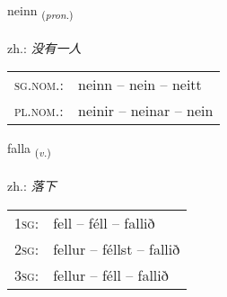 \documentclass[frontgrid, backgrid]{flacards}\usepackage[]{graphicx}\usepackage[]{xcolor}
\begin{document}
\renewcommand{\flhead}{\vskip5pt \fboxsep=0pt {\small\bfseries\footnotesize Fornafn | 代词}}
\renewcommand{\fcfoot}{\vskip5pt \fboxsep=0pt \hspace{2pt}{\small\bfseries\footnotesize 1K}}

\renewcommand{\blhead}{\vskip5pt {\small\bfseries\footnotesize Fornafn | 代词 }}
\renewcommand{\bcfoot}{\vskip5pt \hspace{2pt}{\small\bfseries\footnotesize 1K}}


{neinn \small{\textsubscript{(\textit{pron.})}} \\[1ex] %
\textphonetic{[neitn̥]} \\
zh.: \emph{没有一人} \\  [2ex]
\renewcommand*{\arraystretch}{0.8}
\begin{tabular}{ll}
\textsc{sg.nom.}: & neinn  --  nein -- neitt \\ 
\textsc{pl.nom.}: & neinir -- neinar -- nein
\end{tabular}
}

\renewcommand{\flhead}{\vskip5pt \fboxsep=0pt {\small\bfseries\footnotesize Sagnorð | 动词}}
\renewcommand{\fcfoot}{\vskip5pt \fboxsep=0pt \hspace{2pt}{\small\bfseries\footnotesize 1K}}

\renewcommand{\blhead}{\vskip5pt {\small\bfseries\footnotesize Sagnorð | 动词 }}
\renewcommand{\bcfoot}{\vskip5pt \hspace{2pt}{\small\bfseries\footnotesize 1K}}


{falla \small{\textsubscript{(\textit{v.})}} \\[1ex] %
\textphonetic{[fatla]} \\
zh.: \emph{落下} \\  [2ex]
\renewcommand*{\arraystretch}{0.8}
\begin{tabular}{p{1cm}l}
\textsc{1sg}: & fell -- féll -- fallið \\ 
\textsc{2sg}: & fellur -- féllst -- fallið \\ 
\textsc{3sg}: & fellur -- féll -- fallið \\ 
\end{tabular}
}
\end{document}
